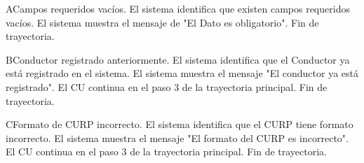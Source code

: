 \begin{UCtrayectoriaA}{A}{Campos requeridos vacíos.}
	\UCpaso El sistema identifica que existen campos requeridos vacíos.
	\UCpaso El sistema muestra el mensaje de "El Dato es obligatorio".
	\UCpaso Fin de trayectoria.
\end{UCtrayectoriaA}

\begin{UCtrayectoriaA}{B}{Conductor registrado anteriormente.}
	\UCpaso El sistema identifica que el Conductor ya está registrado en el sistema.
	\UCpaso El sistema muestra el mensaje "El conductor ya está registrado".
	\UCpaso El CU continua en el paso 3 de la trayectoria principal.
	\UCpaso Fin de trayectoria.
\end{UCtrayectoriaA}

\begin{UCtrayectoriaA}{C}{Formato de CURP incorrecto.}
	\UCpaso El sistema identifica que el CURP tiene formato incorrecto.
	\UCpaso El sistema muestra el mensaje "El formato del CURP es incorrecto".
	\UCpaso El CU continua en el paso 3 de la trayectoria principal.
	\UCpaso Fin de trayectoria.
\end{UCtrayectoriaA}



		
